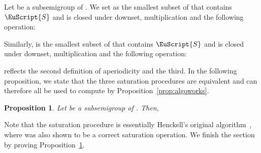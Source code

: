 \documentclass{CSML}
\newcommand\Ss{\ensuremath{\EuScript{S}}\xspace}
\theoremstyle{plain}
\newtheorem{proposition}[thm]{Proposition}
\begin{document}
\smallskip
Let  be a subsemigroup of . We set  as the
smallest subset of  that contains \Ss and is closed under
downset, multiplication and the following operation:

Similarly,  is the smallest subset of  that
contains \Ss and is closed under downset, multiplication and the
following operation:


 reflects the second definition of aperiodicity and
 the third. In the following proposition, we state that the
three saturation procedures are equivalent and can therefore all be
used to compute  by Proposition~\ref{prop:algoworks}.

\begin{proposition} \label{prop:alternate}
  Let  be a subsemigroup of . Then, 
\end{proposition}\smallskip

\noindent Note that the saturation procedure  is essentially Henckell's
original algorithm~\cite{Henckell:Pointlike-sets:-finest-aperiodic:1988:a}, where  was also shown to be a correct saturation operation. We
finish the section by proving Proposition~\ref{prop:alternate}.
\end{document}
